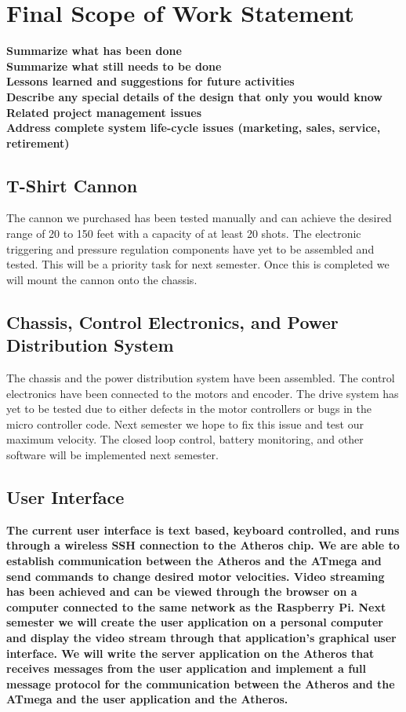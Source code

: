 \documentclass[letterpaper,12pt]{article}
\newcommand{\xxx}[1]{{\color{red}\bf #1}}
\begin{document}
\section{Final Scope of Work Statement}
\label{sec:finalscope}
\xxx{Summarize what has been done} \\
\xxx{Summarize what still needs to be done} \\
\xxx{Lessons learned and suggestions for future activities} \\
\xxx{Describe any special details of the design that only you would know} \\
\xxx{Related project management issues} \\
\xxx{Address complete system life-cycle issues (marketing, sales, service, retirement)}

\subsection{T-Shirt Cannon}
The cannon we purchased has been tested manually and can achieve the desired
range of 20 to 150 feet with a capacity of at least 20 shots. The electronic
triggering and pressure regulation components have yet to be assembled and
tested. This will be a priority task for next semester. Once this is completed
we will mount the cannon onto the chassis.\\

\subsection{Chassis, Control Electronics, and Power Distribution System}
The chassis and the power distribution system have been assembled. The control
electronics have been connected to the motors and encoder. The drive system has
yet to be tested due to either defects in the motor controllers or bugs in the
micro controller code. Next semester we hope to fix this issue and test our
maximum velocity. The closed loop control, battery monitoring, and other
software will be implemented next semester.\\

\subsection{User Interface}
\xxx{The current user interface is text based, keyboard controlled, and runs
through a wireless SSH connection to the Atheros chip. We are able to establish
communication between the Atheros and the ATmega and send commands to change
desired motor velocities. Video streaming has been achieved and can be viewed
through the browser on a computer connected to the same network as the
Raspberry Pi. Next semester we will create the user application on a personal
computer and display the video stream through that application’s graphical user
interface. We will write the server application on the Atheros that receives
messages from the user application and implement a full message protocol for
the communication between the Atheros and the ATmega and the user application
and the Atheros.}\\
\end{document}
